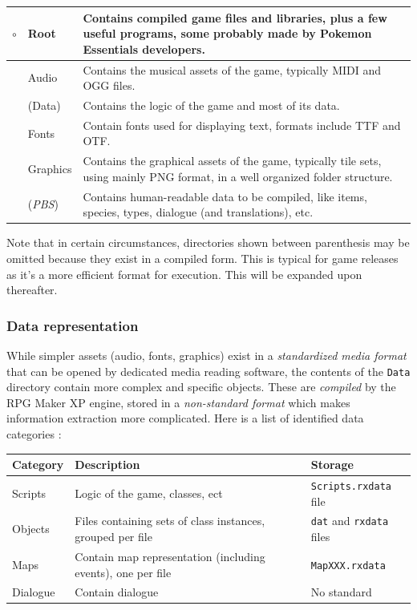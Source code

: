 \documentclass[11pt]{article}
\begin{document}
{\begin{tabular}{|r L{.1\linewidth}|L{.8\linewidth}|}
	\hline
	$\circ$ & Root & Contains compiled game files and libraries, plus a few useful programs, some probably made by Pokemon Essentials developers. \\
	\hline
	 & Audio & Contains the musical assets of the game, typically MIDI and OGG files. \\
	\hline
	 & (Data) & Contains the logic of the game and most of its data.  \\
	\hline
	 & Fonts & Contain fonts used for displaying text, formats include TTF and OTF. \\
	\hline
	 & Graphics & Contains the graphical assets of the game, typically tile sets, using mainly PNG format, in a well organized folder structure. \\
	\hline
	 & (\textit{PBS}) & Contains human-readable data to be compiled, like items, species, types, dialogue (and translations), etc. \\
	\hline
\end{tabular}

Note that in certain circumstances, directories shown between parenthesis may be omitted because they exist in a compiled form. This is typical for game releases as it's a more efficient format for execution. This will be expanded upon thereafter.


\subsubsection{Data representation}

While simpler assets (audio, fonts, graphics) exist in a \textit{standardized media format} that can be opened by dedicated media reading software, the contents of the \verb|Data| directory contain more complex and specific objects. These are \textit{compiled} by the RPG Maker XP engine, stored in a \textit{non-standard format} which makes information extraction more complicated. Here is a list of identified data categories :

{\small
\begin{tabular}{|L{.1\textwidth}|L{.56\textwidth}|L{.26\textwidth}|}
	\hline
	\textbf{Category} & \textbf{Description} & \textbf{Storage} \\
	\hline
	Scripts & Logic of the game, classes, ect & \verb|Scripts.rxdata| file \\
	\hline
	Objects & Files containing sets of class instances, grouped per file & \verb|dat| and \verb|rxdata| files \\
	\hline
	Maps & Contain map representation (including events), one per file & \verb|MapXXX.rxdata| \\
	\hline
	Dialogue & Contain dialogue & No standard \\
	\hline
\end{tabular}}

}
\end{document}
